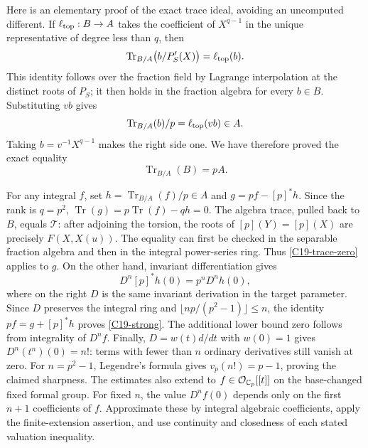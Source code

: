 \documentclass[11pt]{article}
\theoremstyle{definition}\newtheorem{definition}[theorem]{Definition}\newtheorem{remark}[theorem]{Remark}
\begin{document}
Here is an elementary proof of the exact trace ideal, avoiding
an uncomputed different.  If $\ell_{
\rm top}:B\to A$ takes the coefficient of $X^{q-1}$ in the
unique representative of degree less than $q$, then
\[
 \operatorname{Tr}_{B/A}\bigl(b/P_S'(X)\bigr)
      =\ell_{\rm top}(b).
\]
This identity follows over the fraction field by Lagrange
interpolation at the distinct roots of $P_S$; it then holds
in the fraction algebra for every $b\in B$.
Substituting $vb$ gives
\[
 \operatorname{Tr}_{B/A}(b)/p=\ell_{\rm top}(vb)\in A.
\]
Taking $b=v^{-1}X^{q-1}$ makes the right side one.
We have therefore proved the exact equality
\begin{equation}\label{C19-trace-ideal}
 \operatorname{Tr}_{B/A}(B)=pA.
\end{equation}

For any integral $f$, set
$h=\operatorname{Tr}_{B/A}(f)/p\in A$ and
$g=pf-[p]^*h$.  Since the rank is $q=p^2$,
$\operatorname{Tr}(g)=p\operatorname{Tr}(f)-qh=0$.
The algebra trace, pulled back to $B$, equals $\mathcal T$:
after adjoining the torsion, the roots of
$[p](Y)=[p](X)$ are precisely $F(X,X(u))$.
The equality can first be checked in the separable fraction
algebra and then in the integral power-series ring.
Thus \eqref{C19-trace-zero} applies to $g$.
On the other hand, invariant differentiation gives
\[
 D^n[p]^*h(0)=p^nD^nh(0),
\]
where on the right $D$ is the same invariant derivation in the
target parameter.  Since $D$ preserves the integral ring and
$\lfloor np/(p^2-1)\rfloor\leq n$, the identity
$pf=g+[p]^*h$ proves \eqref{C19-strong}.
The additional lower bound zero follows from integrality of
$D^nf$.  Finally, $D=w(t)d/dt$ with $w(0)=1$ gives
$D^n(t^n)(0)=n!$: terms with fewer than $n$ ordinary derivatives
still vanish at zero.  For $n=p^2-1$, Legendre's formula gives
$v_p(n!)=p-1$, proving the claimed sharpness.
The estimates also extend to $f\in\mathcal O_{\mathbb C_p}[[t]]$
on the base-changed fixed formal group.  For fixed $n$, the
value $D^nf(0)$ depends only on the first $n+1$ coefficients
of $f$.  Approximate these by integral algebraic coefficients,
apply the finite-extension assertion, and use continuity and
closedness of each stated valuation inequality.
\end{document}
